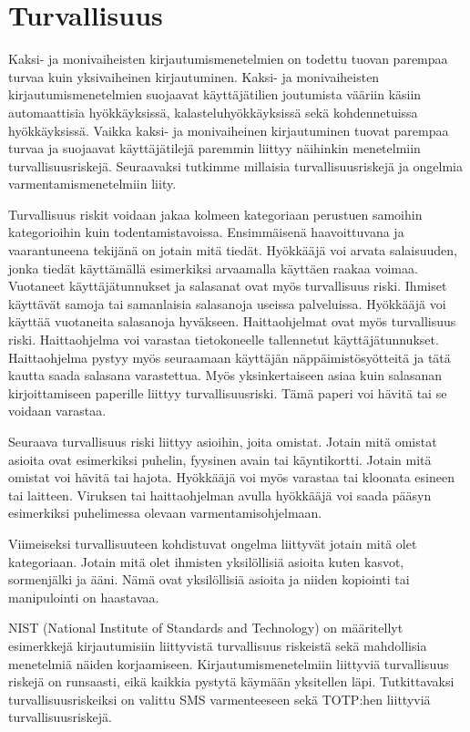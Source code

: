\chapter{Turvallisuus\label{Turvallisuus}}

Kaksi- ja monivaiheisten kirjautumismenetelmien on todettu tuovan parempaa turvaa kuin yksivaiheinen kirjautuminen. Kaksi- ja monivaiheisten kirjautumismenetelmien suojaavat käyttäjätilien joutumista vääriin käsiin automaattisia hyökkäyksissä, kalasteluhyökkäyksissä sekä kohdennetuissa hyökkäyksissä. Vaikka kaksi- ja monivaiheinen kirjautuminen tuovat parempaa turvaa ja suojaavat käyttäjätilejä paremmin liittyy näihinkin menetelmiin turvallisuusriskejä. Seuraavaksi tutkimme millaisia turvallisuusriskejä ja ongelmia varmentamismenetelmiin liity. 

Turvallisuus riskit voidaan jakaa kolmeen kategoriaan perustuen samoihin kategorioihin kuin todentamistavoissa. Ensimmäisenä haavoittuvana ja vaarantuneena tekijänä on jotain mitä tiedät. Hyökkääjä voi arvata salaisuuden, jonka tiedät käyttämällä esimerkiksi arvaamalla käyttäen raakaa voimaa. Vuotaneet käyttäjätunnukset ja salasanat ovat myös turvallisuus riski. Ihmiset käyttävät samoja tai samanlaisia salasanoja useissa palveluissa. Hyökkääjä voi käyttää vuotaneita salasanoja hyväkseen. Haittaohjelmat ovat myös turvallisuus riski. Haittaohjelma voi varastaa tietokoneelle tallennetut käyttäjätunnukset. Haittaohjelma pystyy myös seuraamaan käyttäjän näppäimistösyötteitä ja tätä kautta saada salasana varastettua. Myös yksinkertaiseen asiaa kuin salasanan kirjoittamiseen paperille liittyy turvallisuusriski. Tämä paperi voi hävitä tai se voidaan varastaa.

Seuraava turvallisuus riski liittyy asioihin, joita omistat. Jotain mitä omistat asioita ovat esimerkiksi puhelin, fyysinen avain tai käyntikortti. Jotain mitä omistat voi hävitä tai hajota. Hyökkääjä voi myös varastaa tai kloonata esineen tai laitteen. Viruksen tai haittaohjelman avulla hyökkääjä voi saada pääsyn esimerkiksi puhelimessa olevaan varmentamisohjelmaan. 

Viimeiseksi turvallisuuteen kohdistuvat ongelma liittyvät jotain mitä olet kategoriaan. Jotain mitä olet ihmisten yksilöllisiä asioita kuten kasvot, sormenjälki ja ääni. Nämä ovat yksilöllisiä asioita ja niiden kopiointi tai manipulointi on haastavaa.

NIST (National Institute of Standards and Technology) on määritellyt esimerkkejä kirjautumisiin liittyvistä turvallisuus riskeistä sekä mahdollisia menetelmiä näiden korjaamiseen. Kirjautumismenetelmiin liittyviä turvallisuus riskejä on runsaasti, eikä kaikkia pystytä käymään yksitellen läpi. Tutkittavaksi turvallisuusriskeiksi on valittu SMS varmenteeseen sekä TOTP:hen liittyviä turvallisuusriskejä. \citep{NIST_800_63B}



